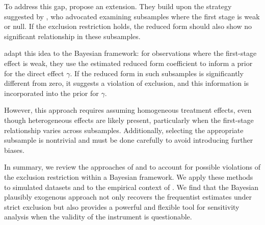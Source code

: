 To address this gap, \cite{vankippersluisPlausiblyExogenous2018} propose an extension. They build upon the strategy suggested by \cite{angristWhyWorldWar1994}, who advocated examining subsamples where the first stage is weak or null. If the exclusion restriction holds, the reduced form should also show no significant relationship in these subsamples. 

\cite{vankippersluisPlausiblyExogenous2018} adapt this idea to the Bayesian framework: for observations where the first-stage effect is weak, they use the estimated reduced form coefficient to inform a prior for the direct effect $\gamma$. If the reduced form in such subsamples is significantly different from zero, it suggests a violation of exclusion, and this information is incorporated into the prior for $\gamma$.

However, this approach requires assuming homogeneous treatment effects, even though heterogeneous effects are likely present, particularly when the first-stage relationship varies across subsamples. Additionally, selecting the appropriate subsample is nontrivial and must be done carefully to avoid introducing further biases.

\bigskip

In summary, we review the approaches of \cite{conleyPlausiblyExogenous2012} and \cite{vankippersluisPlausiblyExogenous2018} to account for possible violations of the exclusion restriction within a Bayesian framework. We apply these methods to simulated datasets and to the empirical context of \cite{acemogluColonialOriginsComparative2001}. We find that the Bayesian plausibly exogenous approach not only recovers the frequentist estimates under strict exclusion but also provides a powerful and flexible tool for sensitivity analysis when the validity of the instrument is questionable.
